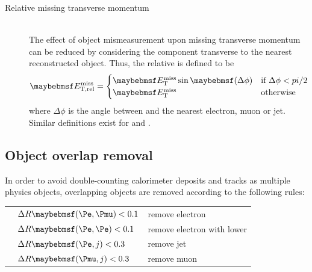 \begin{description}
\item[Relative missing transverse momentum] \hfill \\
	The effect of object mismeasurement upon missing transverse momentum can be reduced 
	by considering the component transverse to the nearest reconstructed object. Thus, 
	the relative \met is defined to be
	\begin{equation}
		\metrel = 
		\begin{cases}
			\met\sin\parenths{\Delta\phi} & \text{if~} \Delta\phi < \pi/2 \\
			\met & \text{otherwise}
		\end{cases}
	\end{equation}
	where $\Delta\phi$ is the angle between \metvec and the nearest electron, muon or jet.
	Similar definitions exist for \trackmetrel and \corrtrackmetrel.

\end{description}



\subsection{Object overlap removal}
\label{sec:objects:overlap}

In order to avoid double-counting calorimeter deposits and tracks as multiple physics 
objects, overlapping objects are removed according to the following rules:

\begin{listliketab}
	\begin{tabular}{Ll@{\hskip 0.3in}l}
		\textbullet & $\Delta R \parenths{\Pe,\Pmu} < 0.1$ & remove electron \\
		\textbullet & $\Delta R \parenths{\Pe,\Pe}  < 0.1$ & remove electron with lower \pt \\
		\textbullet & $\Delta R \parenths{\Pe,j}    < 0.3$ & remove jet \\
		\textbullet & $\Delta R \parenths{\Pmu,j}   < 0.3$ & remove muon \\
	\end{tabular}
\end{listliketab}

